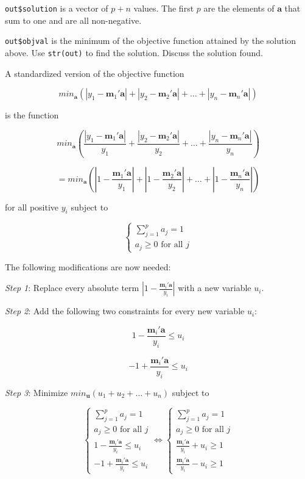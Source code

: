 \documentclass[
]{book}
\begin{document}
\texttt{out\$solution} is a vector of \(p+n\) values. The first \(p\) are the elements of \(\mathbf{a}\) that sum to one and are all non-negative.

\texttt{out\$objval} is the minimum of the objective function attained by the solution above. Use \texttt{str(out)} to find the solution. Discuss the solution found.

A standardized version of the objective function

\[
min_\mathbf{a} \left( |y_1-\mathbf{m}_1'\mathbf{a}| + |y_2-\mathbf{m}_2'\mathbf{a}| + \dots + |y_n-\mathbf{m}_n'\mathbf{a}|    \right)
\]

is the function

\[
min_\mathbf{a} \left( \frac{|y_1-\mathbf{m}_1'\mathbf{a}|}{y_1} + \frac{|y_2-\mathbf{m}_2'\mathbf{a}|}{y_2} + \dots + \frac{|y_n-\mathbf{m}_n'\mathbf{a}|}{y_n}    \right)
\]

\[
= min_\mathbf{a} \left( \left|1 - \frac{\mathbf{m}_1'\mathbf{a}}{y_1} \right| + \left|1 - \frac{\mathbf{m}_2'\mathbf{a}}{y_2} \right| + \dots + |1 - \frac{\mathbf{m}_n'\mathbf{a}}{y_n}|    \right)
\]

for all positive \(y_i\) subject to

\[
\left\{
\begin{array}{ll}
\sum_{j=1}^{p}{a_j} = 1\\
a_j \ge 0 \text{ for all } j
\end{array}
\right.
\]

The following modifications are now needed:

\emph{Step 1}: Replace every absolute term \(\left|1 - \frac{\mathbf{m}_i'\mathbf{a}}{y_i} \right|\) with a new variable \(u_i\).

\emph{Step 2}: Add the following two constraints for every new variable \(u_i\):

\[
1 - \frac{\mathbf{m}_i'\mathbf{a}}{y_i} \le u_i
\]

\[
-1 + \frac{\mathbf{m}_i'\mathbf{a}}{y_i} \le u_i
\]

\emph{Step 3}: Minimize \(min_\mathbf{u}(u_1+u_2+\dots+u_n)\) subject to

\[
\left\{
\begin{array}{ll}
\sum_{j=1}^{p}{a_j} = 1\\
a_j \ge 0 \text{ for all } j\\
1 - \frac{\mathbf{m}_i'\mathbf{a}}{y_i} \le u_i\\
-1 + \frac{\mathbf{m}_i'\mathbf{a}}{y_i} \le u_i
\end{array}
\right.
\Leftrightarrow
\left\{
\begin{array}{ll}
\sum_{j=1}^{p}{a_j} = 1\\
a_j \ge 0 \text{ for all } j\\
\frac{\mathbf{m}_i'\mathbf{a}}{y_i} + u_i \ge 1\\
\frac{\mathbf{m}_i'\mathbf{a}}{y_i} - u_i \ge 1
\end{array}
\right.
\]
\end{document}
